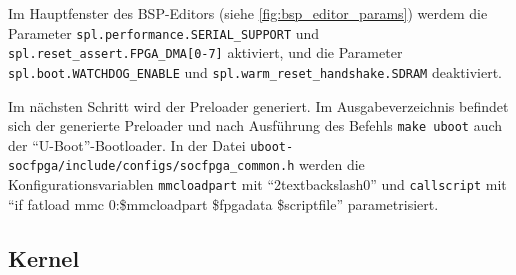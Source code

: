 
Im Hauptfenster des \gls{BSP}-Editors (siehe \cref{fig:bsp_editor_params}) werdem die Parameter \texttt{spl\-.performance\-.SERIAL\-\_SUPPORT} und \texttt{spl.reset\-\_assert\-.FPGA\-\_DMA[0-7]} aktiviert, und die Parameter \texttt{spl\-.boot\-.WATCHDOG\-\_ENABLE} und \texttt{spl\-.warm\-\_reset\-\_handshake\-.SDRAM} deaktiviert. 

Im nächsten Schritt wird der Preloader generiert. Im Ausgabeverzeichnis befindet sich der generierte Preloader und nach Ausführung des Befehls \texttt{make uboot} auch der \enquote{U-Boot}-Bootloader. In der Datei \texttt{uboot-socfpga/include/configs/socfpga\_common.h} werden die Konfigurationsvariablen \texttt{mmcloadpart} mit \enquote{2textbackslash{}0} und \texttt{callscript} mit \enquote{if fatload mmc 0:\$mmcloadpart \$fpgadata \$scriptfile} parametrisiert. 

%	
%	
%	
%

\subsection{Kernel}
\label{sec:impl_kernel}

